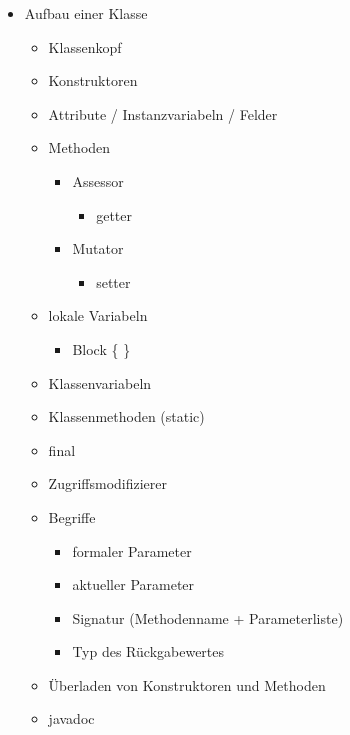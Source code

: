 \begin{itemize}
    \item Aufbau einer Klasse
    \begin{itemize}
        \item Klassenkopf
        \item Konstruktoren
        \item Attribute / Instanzvariabeln / Felder
        \item Methoden
        \begin{itemize}
            \item Assessor
            \begin{itemize}
                \item getter
            \end{itemize}
            \item Mutator
            \begin{itemize}
                \item setter
            \end{itemize}
        \end{itemize}
        \item lokale Variabeln
        \begin{itemize}
            \item Block \{ \}
        \end{itemize}
        \item Klassenvariabeln
        \item Klassenmethoden (static)
        \item final
        \item Zugriffsmodifizierer
        \item Begriffe
        \begin{itemize}
            \item formaler Parameter
            \item aktueller Parameter
            \item Signatur (Methodenname + Parameterliste)
            \item Typ des  Rückgabewertes
        \end{itemize}
        \item Überladen von Konstruktoren und Methoden
        \item javadoc
    \end{itemize}
    

\end{itemize}
